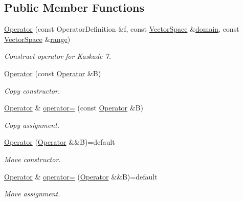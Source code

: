 \subsection*{Public Member Functions}
\begin{DoxyCompactItemize}
\item 
\hyperlink{classSpacy_1_1Kaskade_1_1Operator_ac3b217152eeed8b9f786732d300a024e}{Operator} (const Operator\-Definition \&f, const \hyperlink{classSpacy_1_1VectorSpace}{Vector\-Space} \&\hyperlink{classSpacy_1_1OperatorBase_a2588f9b3e0188820c4c494e63293dc6f}{domain}, const \hyperlink{classSpacy_1_1VectorSpace}{Vector\-Space} \&\hyperlink{classSpacy_1_1OperatorBase_ab19d3b7a6f290b1079248f1e567e53d6}{range})
\begin{DoxyCompactList}\small\item\em Construct operator for Kaskade 7. \end{DoxyCompactList}\item 
\hyperlink{classSpacy_1_1Kaskade_1_1Operator_a01164fcd2ea59f951312c37b39ee4f11}{Operator} (const \hyperlink{classSpacy_1_1Kaskade_1_1Operator}{Operator} \&B)
\begin{DoxyCompactList}\small\item\em Copy constructor. \end{DoxyCompactList}\item 
\hyperlink{classSpacy_1_1Kaskade_1_1Operator}{Operator} \& \hyperlink{classSpacy_1_1Kaskade_1_1Operator_a18453c4bbf4040cc0534535ae0b0bbd9}{operator=} (const \hyperlink{classSpacy_1_1Kaskade_1_1Operator}{Operator} \&B)
\begin{DoxyCompactList}\small\item\em Copy assignment. \end{DoxyCompactList}\item 
\hyperlink{classSpacy_1_1Kaskade_1_1Operator_abf7b871f49a8d6dde96c6ed7860820b0}{Operator} (\hyperlink{classSpacy_1_1Kaskade_1_1Operator}{Operator} \&\&B)=default
\begin{DoxyCompactList}\small\item\em Move constructor. \end{DoxyCompactList}\item 
\hyperlink{classSpacy_1_1Kaskade_1_1Operator}{Operator} \& \hyperlink{classSpacy_1_1Kaskade_1_1Operator_a5efe7986ca35ec405f4672ca04ac8349}{operator=} (\hyperlink{classSpacy_1_1Kaskade_1_1Operator}{Operator} \&\&B)=default
\begin{DoxyCompactList}\small\item\em Move assignment. \end{DoxyCompactList}\item 

\end{DoxyCompactItemize}
